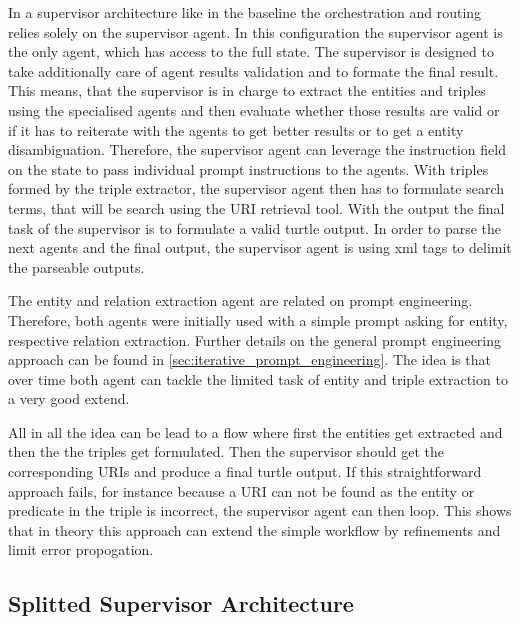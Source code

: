 \documentclass[a4paper,oneside,bibliography=totoc]{scrbook}
\begin{document}
In a supervisor architecture like in the baseline the orchestration and routing relies solely on the supervisor agent. In this configuration the supervisor agent is the only agent, which has access to the full state. The supervisor is designed to take additionally care of agent results validation and to formate the final result. This means, that the supervisor is in charge to extract the entities and triples using the specialised agents and then evaluate whether those results are valid or if it has to reiterate with the agents to get better results or to get a entity disambiguation. Therefore, the supervisor agent can leverage the instruction field on the state to pass individual prompt instructions to the agents. With triples formed by the triple extractor, the supervisor agent then has to formulate search terms, that will be search using the URI retrieval tool. With the output the final task of the supervisor is to formulate a valid turtle output. In order to parse the next agents and the final output, the supervisor agent is using xml tags to delimit the parseable outputs.

The entity and relation extraction agent are related on prompt engineering. Therefore, both agents were initially used with a simple prompt asking for entity, respective relation extraction. Further details on the general prompt engineering approach can be found in \ref{sec:iterative_prompt_engineering}. The idea is that over time both agent can tackle the limited task of entity and triple extraction to a very good extend.

All in all the idea can be lead to a flow where first the entities get extracted and then the the triples get formulated. Then the supervisor should get the corresponding URIs and produce a final turtle output. If this straightforward approach fails, for instance because a URI can not be found as the entity or predicate in the triple is incorrect, the supervisor agent can then loop. This shows that in theory this approach can extend the simple workflow by refinements and limit error propogation.

\subsection{Splitted Supervisor Architecture}
\label{subsec:supervisor}
\end{document}
